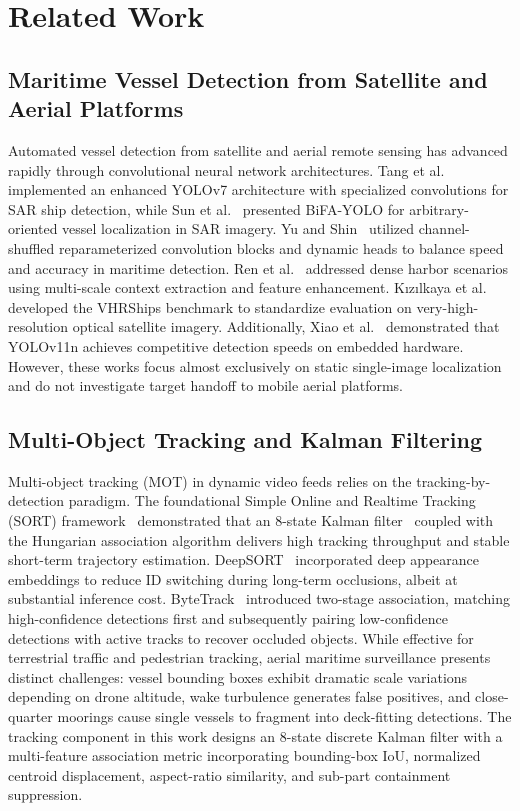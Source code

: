\documentclass[conference]{IEEEtran}
\begin{document}
\section{Related Work}

\subsection{Maritime Vessel Detection from Satellite and Aerial Platforms}
Automated vessel detection from satellite and aerial remote sensing has advanced rapidly through convolutional neural network architectures. Tang et al.~\cite{tang2024} implemented an enhanced YOLOv7 architecture with specialized convolutions for SAR ship detection, while Sun et al.~\cite{sun2021} presented BiFA-YOLO for arbitrary-oriented vessel localization in SAR imagery. Yu and Shin~\cite{yu2024} utilized channel-shuffled reparameterized convolution blocks and dynamic heads to balance speed and accuracy in maritime detection. Ren et al.~\cite{ren2026} addressed dense harbor scenarios using multi-scale context extraction and feature enhancement. K{\i}z{\i}lkaya et al.~\cite{kizilkaya2025} developed the VHRShips benchmark to standardize evaluation on very-high-resolution optical satellite imagery. Additionally, Xiao et al.~\cite{xiao2026} demonstrated that YOLOv11n achieves competitive detection speeds on embedded hardware. However, these works focus almost exclusively on static single-image localization and do not investigate target handoff to mobile aerial platforms.

\subsection{Multi-Object Tracking and Kalman Filtering}
Multi-object tracking (MOT) in dynamic video feeds relies on the tracking-by-detection paradigm. The foundational Simple Online and Realtime Tracking (SORT) framework~\cite{bewley2016sort} demonstrated that an 8-state Kalman filter~\cite{kalman1960} coupled with the Hungarian association algorithm delivers high tracking throughput and stable short-term trajectory estimation. DeepSORT~\cite{wojke2017deepsort} incorporated deep appearance embeddings to reduce ID switching during long-term occlusions, albeit at substantial inference cost. ByteTrack~\cite{zhang2022bytetrack} introduced two-stage association, matching high-confidence detections first and subsequently pairing low-confidence detections with active tracks to recover occluded objects. While effective for terrestrial traffic and pedestrian tracking, aerial maritime surveillance presents distinct challenges: vessel bounding boxes exhibit dramatic scale variations depending on drone altitude, wake turbulence generates false positives, and close-quarter moorings cause single vessels to fragment into deck-fitting detections. The tracking component in this work designs an 8-state discrete Kalman filter with a multi-feature association metric incorporating bounding-box IoU, normalized centroid displacement, aspect-ratio similarity, and sub-part containment suppression.
\end{document}
